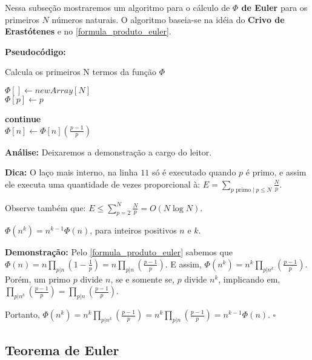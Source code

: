 Nessa subseção mostraremos um algoritmo para o cálculo de \textbf{$\Phi$ de Euler} para os primeiros $N$ números naturais.
O algoritmo baseia-se na idéia do \textbf{Crivo de Erastótenes} e no \autoref{formula_produto_euler}.
\newline

\textbf{Pseudocódigo:}
\begin{algorithm}
\caption{Calcula os primeiros N termos da função $\Phi$}\label{phi_de_euler_algoritmh}
\begin{algorithmic}[1]
\State $\Phi[] \gets new Array[N]$
\\
\State $\Phi[p] \gets p$
\EndFor
\\

 
\State \textbf{continue}
\EndIf
\\
\State $\Phi[n] \gets \Phi[n] (\frac{p-1}{p})$
\EndFor
\EndFor
\\
\State \Return {$\Phi[]$}
\EndProcedure
\end{algorithmic}
\end{algorithm}

\textbf{Análise:}
Deixaremos a demonstração a cargo do leitor.

\textbf{Dica:}
O laço mais interno, na linha $11$ só é executado quando $p$ é primo, e assim ele executa uma quantidade de vezes proporcional à:
$E = \sum_{p\text{ primo} \mid p \leq N}\frac{N}{p} $.

Observe também que: $E \leq \sum_{p=2}^{N}\frac{N}{p} = O(N\log N)$. 


\begin{proposition}\label{phi_potencia_nk}
$\Phi(n^k) = n^{k-1}\Phi(n)$, para inteiros positivos $n$ e $k$. 
\end{proposition}
\textbf{Demonstração:}
Pelo \autoref{formula_produto_euler} sabemos que $\Phi(n) = n \prod_{p|n}(1 - \frac{1}{p}) = n \prod_{p|n}(\frac{p-1}{p})$.
E assim, $\Phi(n^k) = n^k \prod_{p|n^k}(\frac{p-1}{p})$. Porém, um primo $p$ divide $n$, se e somente se, $p$ divide $n^k$, implicando em, 
$\prod_{p|n^k}(\frac{p-1}{p}) = \prod_{p|n}(\frac{p-1}{p})$.

Portanto, $\Phi(n^k) = n^k \prod_{p|n^k}(\frac{p-1}{p}) = n^k \prod_{p|n}(\frac{p-1}{p}) = n^{k-1}\Phi(n)$. $\square$


\subsection{Teorema de Euler}

